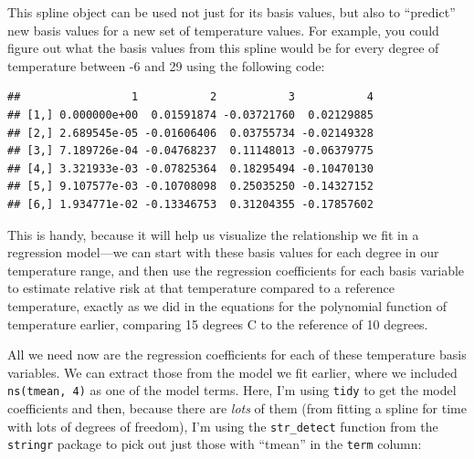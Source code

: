 \documentclass[
]{book}
\newenvironment{Shaded}{\begin{snugshade}}{\end{snugshade}}
\newcommand{\AttributeTok}[1]{\textcolor[rgb]{0.77,0.63,0.00}{#1}}
\newcommand{\DecValTok}[1]{\textcolor[rgb]{0.00,0.00,0.81}{#1}}
\newcommand{\FunctionTok}[1]{\textcolor[rgb]{0.00,0.00,0.00}{#1}}
\newcommand{\NormalTok}[1]{#1}
\newcommand{\OtherTok}[1]{\textcolor[rgb]{0.56,0.35,0.01}{#1}}
\newcommand{\SpecialCharTok}[1]{\textcolor[rgb]{0.00,0.00,0.00}{#1}}
\begin{document}
This spline object can be used not just for its basis values, but also to ``predict'' new
basis values for a new set of temperature values. For example, you could figure out
what the basis values from this spline would be for every degree of temperature between
-6 and 29 using the following code:

\begin{Shaded}
\end{Shaded}

\begin{verbatim}
##                 1           2           3           4
## [1,] 0.000000e+00  0.01591874 -0.03721760  0.02129885
## [2,] 2.689545e-05 -0.01606406  0.03755734 -0.02149328
## [3,] 7.189726e-04 -0.04768237  0.11148013 -0.06379775
## [4,] 3.321933e-03 -0.07825364  0.18295494 -0.10470130
## [5,] 9.107577e-03 -0.10708098  0.25035250 -0.14327152
## [6,] 1.934771e-02 -0.13346753  0.31204355 -0.17857602
\end{verbatim}

This is handy, because it will help us visualize the relationship we fit in a regression
model---we can start with these basis values for each degree in our temperature range, and
then use the regression coefficients for each basis variable to estimate relative risk
at that temperature compared to a reference temperature, exactly as we did in the equations
for the polynomial function of temperature earlier, comparing 15 degrees C to the reference
of 10 degrees.

All we need now are the regression coefficients for each of these temperature basis
variables. We can extract those from the model we fit earlier, where we included
\texttt{ns(tmean,\ 4)} as one of the model terms. Here, I'm using \texttt{tidy} to get the model
coefficients and then, because there are \emph{lots} of them (from fitting a spline for
time with lots of degrees of freedom), I'm using the \texttt{str\_detect} function from the
\texttt{stringr} package to pick out just those with ``tmean'' in the \texttt{term} column:
\end{document}
